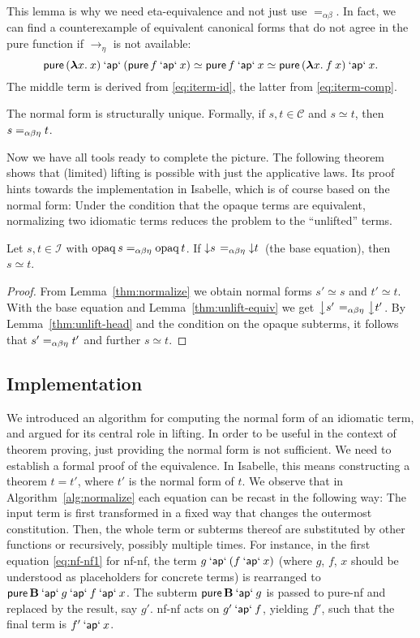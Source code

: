 This lemma is why we need eta-equivalence and not just use $=_{\alpha\beta}$.
In fact, we can find a counterexample of equivalent canonical forms that do
not agree in the pure function if $\to_\eta$ is not available:
\[ \operatorname{\mathsf{pure}}{({\boldsymbol\lambda} x.\>x)} \mathbin{\mathsf{`ap`}} (\operatorname{\mathsf{pure}} f \mathbin{\mathsf{`ap`}} x) \simeq
	\operatorname{\mathsf{pure}} f \mathbin{\mathsf{`ap`}} x \simeq \operatorname{\mathsf{pure}}{({\boldsymbol\lambda} x.\>f \> x)} \mathbin{\mathsf{`ap`}} x. \]
The middle term is derived from \eqref{eq:iterm-id}, the latter from
\eqref{eq:iterm-comp}.

\begin{corollary}\label{thm:nf-unique}
The normal form is structurally unique.
Formally, if $s,t \in \mathcal{C}$ and $s \simeq t$, then $s =_{\alpha\beta\eta} t$.
\end{corollary}

Now we have all tools ready to complete the picture.
The following theorem shows that (limited) lifting is possible with just
the applicative laws.
Its proof hints towards the implementation in Isabelle, which is of course
based on the normal form:
Under the condition that the opaque terms are equivalent, normalizing two
idiomatic terms reduces the problem to the ``unlifted'' terms.

\begin{theorem}\label{thm:nf-lifting}
Let $s,t \in \mathcal{I}$ with $\operatorname{opaq} s =_{\alpha\beta\eta} \operatorname{opaq} t$.
If $\left\downarrow s\right. =_{\alpha\beta\eta} \left\downarrow t\right.$ (the base equation), then $s \simeq t$.
\end{theorem}
\begin{proof}
From Lemma~\ref{thm:normalize} we obtain normal forms $s' \simeq s$ and
$t' \simeq t$.
With the base equation and Lemma~\ref{thm:unlift-equiv} we get
$\left\downarrow s'\right. =_{\alpha\beta\eta} \left\downarrow t'\right.$.
By Lemma~\ref{thm:unlift-head} and the condition on the opaque subterms, it
follows that $s' =_{\alpha\beta\eta} t'$ and further $s \simeq t$.
\end{proof}

\subsection{Implementation}\label{subsec:nf-implementation}  %

We introduced an algorithm for computing the normal form of an idiomatic term,
and argued for its central role in lifting.
In order to be useful in the context of theorem proving, just providing the
normal form is not sufficient.
We need to establish a formal proof of the equivalence.
In Isabelle, this means constructing a theorem $t = t'$, where $t'$ is the
normal form of $t$.
We observe that in Algorithm~\ref{alg:normalize} each equation can be recast
in the following way:
The input term is first transformed in a fixed way that changes the outermost
constitution.
Then, the whole term or subterms thereof are substituted by other functions
or recursively, possibly multiple times.
For instance, in the first equation \eqref{eq:nf-nf1} for nf-nf, the term
$g \mathbin{\mathsf{`ap`}} (f \mathbin{\mathsf{`ap`}} x)$ (where $g$, $f$, $x$ should be understood as placeholders
for concrete terms) is rearranged to $\operatorname{\mathsf{pure}} \mathbf{B} \mathbin{\mathsf{`ap`}} g \mathbin{\mathsf{`ap`}} f \mathbin{\mathsf{`ap`}} x$.
The subterm $\operatorname{\mathsf{pure}} \mathbf{B} \mathbin{\mathsf{`ap`}} g$ is passed to pure-nf and replaced by
the result, say $g'$.
nf-nf acts on $g' \mathbin{\mathsf{`ap`}} f$, yielding $f'$, such that the final term is
$f' \mathbin{\mathsf{`ap`}} x$.

